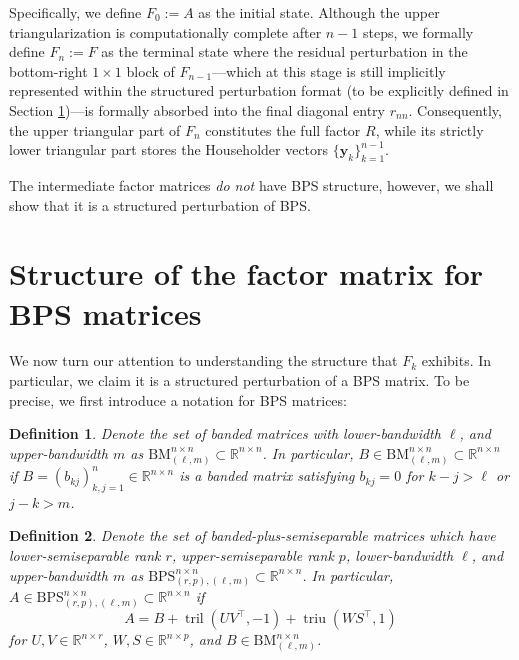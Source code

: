 \documentclass[a4paper,fleqn]{cas-sc}
\newtheorem{definition}{Definition}
\def\bbR{{\mathbb R}}
\def\BM{{\mathrm{BM}}_{(\ell,m)}^{n \times n}}
\def\BPS{{\mathrm{BPS}}_{(r,p),(\ell,m)}^{n \times n}}
\def\bftau{{\bm\tau}}
\DeclareMathOperator{\triu}{triu}
\DeclareMathOperator{\tril}{tril}
\begin{document}
Specifically, we define $F_0 := A$ as the initial state. Although the upper triangularization is computationally complete after $n-1$ steps, we formally define $F_n:=F$ as the terminal state where the residual perturbation in the bottom-right $1 \times 1$ block of $F_{n-1}$—which at this stage is still implicitly represented within the structured perturbation format (to be explicitly defined in Section \ref{sec:main})—is formally absorbed into the final diagonal entry $r_{nn}$. Consequently, the upper triangular part of $F_n$ constitutes the full factor $R$, while its strictly lower triangular part stores the Householder vectors $\{\mathbf{y}_k\}_{k=1}^{n-1}$.


The intermediate factor matrices {\it do not} have BPS structure, however, we shall show that it is a structured perturbation of BPS.

\section{Structure of the factor matrix for BPS matrices}
\label{sec:main}

We now turn our attention to understanding the structure that $F_k$ exhibits.  In particular, we claim it is a structured perturbation of a BPS matrix. To be precise, we first introduce a notation for BPS matrices:

\begin{definition}
Denote the set of {\it banded matrices}  with lower-bandwidth $\ell$, and upper-bandwidth $m$  as $\BM \subset \bbR^{n \times n}$. In particular, $B \in \BM \subset \bbR^{n \times n}$ if
 \( B = (b_{kj})_{k,j=1}^n \in \mathbb{R}^{n \times n} \) is a banded matrix satisfying \( b_{kj}=0 \) for \( k-j>\ell \) or \( j-k>m \).
\end{definition}




\begin{definition}
Denote the set of {\it banded-plus-semiseparable matrices} which have lower-semiseparable rank $r$, upper-semiseparable rank $p$, lower-bandwidth $\ell$, and upper-bandwidth $m$  as $\BPS \subset \bbR^{n \times n}$. In particular, $A \in \BPS \subset \bbR^{n \times n}$ if
\[
A = B + \tril(UV^\top, -1) + \triu(WS^\top, 1)\label{express_A}
\]
for \( U, V \in \mathbb{R}^{n\times r} \), \( W, S \in \mathbb{R}^{n\times p} \), and \( B   \in \BM \).
\end{definition}
\end{document}
